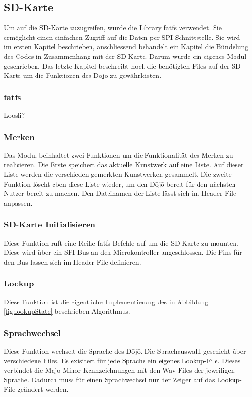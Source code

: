 \subsection{SD-Karte}\label{sec:sdKarte}
Um auf die SD-Karte zuzugreifen, wurde die Library fatfs verwendet. Sie ermöglicht einen einfachen Zugriff auf die Daten per SPI-Schnittstelle. Sie wird im ersten Kapitel beschrieben, anschliessend behandelt ein Kapitel die Bündelung des Codes in Zusammenhang mit der SD-Karte. Darum wurde ein eigenes Modul geschrieben. Das letzte Kapitel beschreibt noch die benötigten Files auf der SD-Karte um die Funktionen des Dōjō zu gewährleisten.

\subsubsection{fatfs}
Loosli?


\subsubsection{Merken}
Das Modul beinhaltet zwei Funktionen um die Funktionalität des Merken zu realisieren. Die Erste speichert das aktuelle Kunstwerk auf eine Liste. Auf dieser Liste werden die verschieden gemerkten Kunstwerken gesammelt. Die zweite Funktion löscht eben diese Liste wieder, um den Dōjō bereit für den nächsten Nutzer bereit zu machen. Den Dateinamen der Liste lässt sich im Header-File anpassen.

\subsubsection{SD-Karte Initialisieren}
Diese Funktion ruft eine Reihe fatfs-Befehle auf um die SD-Karte zu mounten. Diese wird über ein SPI-Bus an den Microkontroller angeschlossen. Die Pins für den Bus lassen sich im Header-File definieren.

\subsubsection{Lookup}
Diese Funktion ist die eigentliche Implementierung des in Abbildung \ref{fig:lookupState} beschrieben Algorithmus.

\subsubsection{Sprachwechsel}
Diese Funktion wechselt die Sprache des Dōjō. Die Sprachauswahl geschieht über verschiedene Files. Es exisitert für jede Sprache ein eigenes Lookup-File. Dieses verbindet die Majo-Minor-Kennzeichnungen mit den Wav-Files der jeweiligen Sprache. Dadurch muss für einen Sprachwechsel nur der Zeiger auf das Lookup-File geändert werden.

